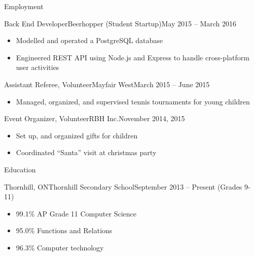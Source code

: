\documentclass[]{mcdowellcv}
\begin{document}
	\makeheader

	\begin{cvsection}{Employment}
		\begin{cvsubsection}{Back End Developer}{Beerhopper (Student Startup)}{May 2015 -- March 2016}
			\begin{itemize}
				\item Modelled and operated a PostgreSQL database
				\item Engineered REST API using Node.js and Express to handle cross-platform user activities
			\end{itemize}
		\end{cvsubsection}

		\begin{cvsubsection}{Assistant Referee, Volunteer}{Mayfair West}{March 2015 -- June 2015}
			\begin{itemize}
				\item Managed, organized, and supervised tennis tournaments for young children
			\end{itemize}
		\end{cvsubsection}

		\begin{cvsubsection}{Event Organizer, Volunteer}{RBH Inc.}{November 2014, 2015}
			\begin{itemize}
				\item Set up, and organized gifts for children
				\item Coordinated “Santa” visit at christmas party
			\end{itemize}
		\end{cvsubsection}
	\end{cvsection}

	\begin{cvsection}{Education}
		\begin{cvsubsection}{Thornhill, ON}{Thornhill Secondary School}{September 2013 -- Present (Grades 9-11)}
			\begin{itemize}
				\item 99.1\% AP Grade 11 Computer Science
				\item 95.0\% Functions and Relations
				\item 96.3\% Computer technology
			\end{itemize}
		\end{cvsubsection}
	\end{cvsection}
\end{document}
